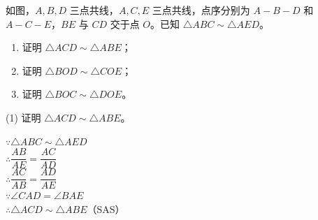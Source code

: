 \documentclass{exam-zh}
\begin{document}

\begin{eduProblemBlock}[模型例题]
\noindent
\begin{minipage}[t]{\dimexpr\linewidth-70mm-6mm\relax}
\vspace{0pt}
如图，$A,B,D$ 三点共线，$A,C,E$ 三点共线，点序分别为 $A-B-D$ 和 $A-C-E$，$BE$ 与 $CD$ 交于点 $O$。已知 $\triangle ABC\sim\triangle AED$。

\begin{enumerate}[label=(\arabic*)]
  \item 证明 $\triangle ACD\sim\triangle ABE$；
  \item 证明 $\triangle BOD\sim\triangle COE$；
  \item 证明 $\triangle BOC\sim\triangle DOE$。
\end{enumerate}

\end{minipage}\hfill
\begin{diagramcoltikz}{70mm}{先找 $A$ 处的共角，再找 $O$ 处的对顶角。}
}
\end{diagramcoltikz}
\end{eduProblemBlock}









\begin{eduSubQuestionItem}{(1)}
证明 $\triangle ACD\sim\triangle ABE$。\end{eduSubQuestionItem}

\begin{eduDualExplain}
  \begin{eduExplainLeft}
  \end{eduExplainLeft}

  \begin{eduExplainRight}
$\because \triangle ABC\sim\triangle AED$\\
$\therefore \dfrac{AB}{AE}=\dfrac{AC}{AD}$\\
$\therefore \dfrac{AC}{AB}=\dfrac{AD}{AE}$\\
$\because \angle CAD=\angle BAE$\\
$\therefore \triangle ACD\sim\triangle ABE$（SAS）
  \end{eduExplainRight}
\end{eduDualExplain}
\end{document}
